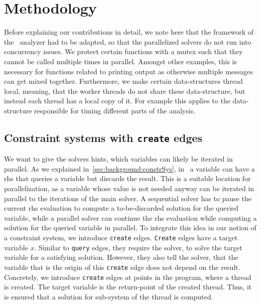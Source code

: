 \section{Methodology}
\label{sec:method}
Before explaining our contributions in detail, we note here that the framework of the \gob\ analyzer had to be adapted, so that the parallelized solvers do not run into concurrency issues. We  protect certain functions with a mutex such that they cannot be called multiple times in parallel. Amongst other examples, this is necessary for functions related to printing output as otherwise multiple messages can get mixed together. Furthermore, we make certain data-structures thread local, meaning, that the worker threads do not share these data-structure, but instead each thread has a local copy of it. For example this applies to the data-structure responsible for timing different parts of the analysis.

  \subsection{Constraint systems with \texttt{create} edges}
  \label{sec:method:create}
  We want to give the solvers hints, which variables can likely be iterated in parallel. As we explained in~\autoref{sec:background:constrSys}, in \gob\ a variable can have a \ac{rhs} that queries a variable but discards the result. This is a suitable location for parallelization, as a variable whose value is not needed anyway can be iterated in parallel to the iterations of the main solver. A sequential solver has to pause the current \ac{rhs} evaluation to compute a to-be-discarded solution for the queried variable, while a parallel solver can continue the \ac{rhs} evaluation while computing a solution for the queried variable in parallel.
  To integrate this idea in our notion of a constraint system, we introduce \texttt{create} edges. \texttt{Create} edges have a target variable $x$. Similar to \texttt{query} edges, they require the solver, to solve the target variable for a satisfying solution. However, they also tell the solver, that the variable that is the origin of this \texttt{create} edge does not depend on the result. Concretely, we introduce \texttt{create} edges at points in the program, where a thread is created. The target variable is the return-point of the created thread. Thus, it is ensured that a solution for sub-system of the thread is computed.

